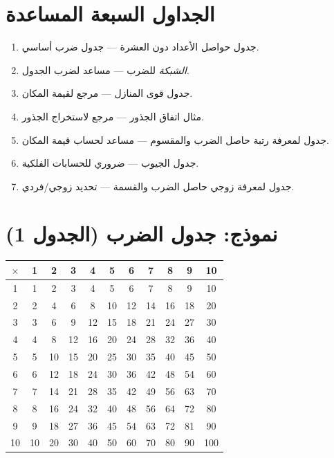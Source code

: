 \documentclass[11pt,a4paper]{book}
\newcommand{\ar}[1]{\arabicfont\beginR #1\endR}
\begin{document}
\section{\ar{الجداول السبعة المساعدة}}

\begin{enumerate}[label=\textbf{\ar{جدول} \arabic*:}]
  \item \ar{جدول حواصل الأعداد دون العشرة — جدول ضرب أساسي.}
  \item \ar{\textit{الشبكة} للضرب — مساعد لضرب الجدول.}
  \item \ar{جدول قوى المنازل — مرجع لقيمة المكان.}
  \item \ar{مثال اتفاق الجذور — مرجع لاستخراج الجذور.}
  \item \ar{جدول لمعرفة رتبة حاصل الضرب والمقسوم — مساعد لحساب قيمة المكان.}
  \item \ar{جدول الجيوب — ضروري للحسابات الفلكية.}
  \item \ar{جدول لمعرفة زوجي حاصل الضرب والقسمة — تحديد زوجي/فردي.}
\end{enumerate}

\section{\ar{نموذج: جدول الضرب (الجدول 1)}}

\begin{center}
\begin{tabular}{|c|cccccccccc|}
\hline
$\times$ & 1 & 2 & 3 & 4 & 5 & 6 & 7 & 8 & 9 & 10 \\
\hline
1 & 1 & 2 & 3 & 4 & 5 & 6 & 7 & 8 & 9 & 10 \\
2 & 2 & 4 & 6 & 8 & 10 & 12 & 14 & 16 & 18 & 20 \\
3 & 3 & 6 & 9 & 12 & 15 & 18 & 21 & 24 & 27 & 30 \\
4 & 4 & 8 & 12 & 16 & 20 & 24 & 28 & 32 & 36 & 40 \\
5 & 5 & 10 & 15 & 20 & 25 & 30 & 35 & 40 & 45 & 50 \\
6 & 6 & 12 & 18 & 24 & 30 & 36 & 42 & 48 & 54 & 60 \\
7 & 7 & 14 & 21 & 28 & 35 & 42 & 49 & 56 & 63 & 70 \\
8 & 8 & 16 & 24 & 32 & 40 & 48 & 56 & 64 & 72 & 80 \\
9 & 9 & 18 & 27 & 36 & 45 & 54 & 63 & 72 & 81 & 90 \\
10 & 10 & 20 & 30 & 40 & 50 & 60 & 70 & 80 & 90 & 100 \\
\hline
\end{tabular}
\end{center}
\clearpage
\end{document}
